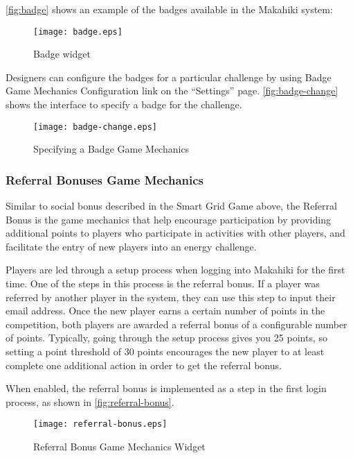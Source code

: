 \autoref{fig:badge} shows an example of the badges available in the Makahiki system:

\begin{figure}[t!]
  \center
  \texttt{[image: badge.eps]}
  \caption{Badge widget}
  \label{fig:badge}
\end{figure}

Designers can configure the badges for a particular challenge by using Badge Game Mechanics Configuration link on the ``Settings'' page. \autoref{fig:badge-change} shows the interface to specify a badge for the challenge.

\begin{figure}[!ht]
  \center
  \texttt{[image: badge-change.eps]}
  \caption{Specifying a Badge Game Mechanics}
  \label{fig:badge-change}
\end{figure}

\clearpage

\subsubsection{Referral Bonuses Game Mechanics}

Similar to social bonus described in the Smart Grid Game above, the Referral Bonus is the game mechanics that help encourage participation by providing additional points to players who participate in activities with other players, and facilitate the entry of new players into an energy challenge.

Players are led through a setup process when logging into Makahiki for the first time. One of the steps in this process is the referral bonus. If a player was referred by another player in the system, they can use this step to input their email address. Once the new player earns a certain number of points in the competition, both players are awarded a referral bonus of a configurable number of points. Typically, going through the setup process gives you 25 points, so setting a point threshold of 30 points encourages the new player to at least complete one additional action in order to get the referral bonus.

When enabled, the referral bonus is implemented as a step in the first login process, as shown in \autoref{fig:referral-bonus}.

\begin{figure}[!ht]
  \center
  \texttt{[image: referral-bonus.eps]}
  \caption{Referral Bonus Game Mechanics Widget}
  \label{fig:referral-bonus}
\end{figure}


